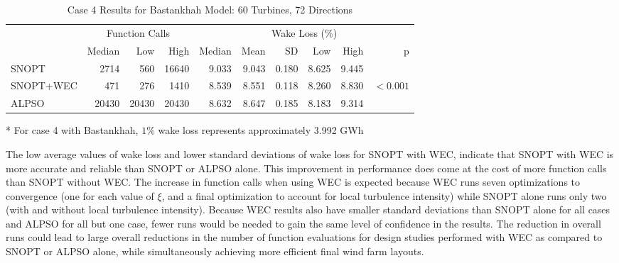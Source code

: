 \documentclass{jpconf}
\begin{document}
\begin{table}
	\centering
	\caption{Case 4 Results for Bastankhah Model: 60 Turbines, 72 Directions}
	\label{tab:case4}
	\begin{threeparttable}
	\begin{tabular}{lrrrrrrrrr}
		\toprule
		{} & \multicolumn{3}{c}{Function Calls} & \multicolumn{6}{c}{Wake Loss (\%)\tnote{*}} \\
		\cmidrule(lr){2-4} \cmidrule(lr){5-10}
		{} &         Median &    Low &   High &        Median &  Mean &    SD &   Low &  High &          p \\
		\cmidrule(lr){2-4} \cmidrule(lr){5-10}
		SNOPT     &           2714 &    560 &  16640 &         9.033 & 9.043 & 0.180 & 8.625 & 9.445 &            \\
		SNOPT+WEC &            471 &    276 &   1410 &         8.539 & 8.551 & 0.118 & 8.260 & 8.830 &  $< 0.001$ \\
		ALPSO     &          20430 &  20430 &  20430 &         8.632 & 8.647 & 0.185 & 8.183 & 9.314 &            \\
		\bottomrule
	\end{tabular}
	\begin{tablenotes}
		\item[*] For case 4 with Bastankhah, $1\%$ wake loss represents approximately 3.992 GWh
	\end{tablenotes}
	\end{threeparttable}
\end{table}

The low average values of wake loss and lower standard deviations of wake loss for SNOPT with WEC, indicate that SNOPT with WEC is more accurate and reliable than SNOPT or ALPSO alone. This improvement in performance does come at the cost of more function calls than SNOPT without WEC. The increase in function calls when using WEC is expected because WEC runs seven optimizations to convergence (one for each value of $\xi$, and a final optimization to account for local turbulence intensity) while SNOPT alone runs only two (with and without local turbulence intensity). Because WEC results also have smaller standard deviations than SNOPT alone for all cases and ALPSO for all but one case, fewer runs would be needed to gain the same level of confidence in the results. The reduction in overall runs could lead to large overall reductions in the number of function evaluations for design studies performed with WEC as compared to SNOPT or ALPSO alone, while simultaneously achieving more efficient final wind farm layouts.
\end{document}
